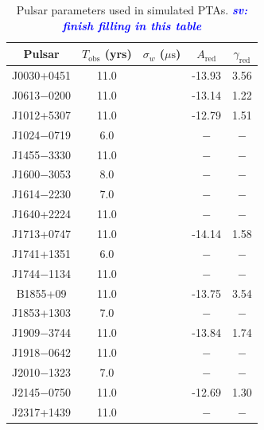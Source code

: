\documentclass[twocolumn,aps,prd,superscriptaddress]{revtex4-1}
\newcommand{\sv}[1]{\textcolor{blue}{\it{\textbf{sv: #1}}} }
\begin{document}
\begin{table}[!tb]
	\setlength{\tabcolsep}{5pt}
	\caption{Pulsar parameters used in simulated PTAs. \sv{finish filling in this table}}
	\begin{center}
	\begin{tabular}{ccccc}
		\hline\hline
    		Pulsar	& $T_\mathrm{obs}$ (yrs) & $\sigma_w$ ($\mu\mathrm{s}$) & $A_\mathrm{red}$ & $\gamma_\mathrm{red}$ \\
		\hline
		J0030+0451 & 11.0 & & -13.93 & 3.56 \\
		J0613$-$0200 & 11.0 &  & -13.14 & 1.22 \\
		J1012+5307 & 11.0 &  & -12.79 & 1.51 \\
		J1024$-$0719 & 6.0 & & $-$ & $-$ \\
		J1455$-$3330 & 11.0 & & $-$ & $-$ \\
		J1600$-$3053 & 8.0 & & $-$ & $-$ \\
		J1614$-$2230 & 7.0 & & $-$ & $-$ \\
		J1640+2224 & 11.0 & & $-$ & $-$ \\
		J1713+0747 & 11.0 & & -14.14 & 1.58 \\
		J1741+1351 & 6.0 & & $-$ & $-$ \\
		J1744$-$1134 & 11.0 & & $-$ & $-$ \\
		B1855+09 & 11.0 & & -13.75 & 3.54 \\
		J1853+1303 & 7.0 & & $-$ & $-$ \\
		J1909$-$3744 & 11.0 &  & -13.84 & 1.74  \\
		J1918$-$0642 & 11.0 & & $-$ & $-$ \\
		J2010$-$1323 & 7.0 & & $-$ & $-$ \\
		J2145$-$0750 & 11.0 &  & -12.69 & 1.30 \\
		J2317+1439 & 11.0 & & $-$ & $-$ \\
    		\hline\hline
	\end{tabular}
	\end{center}
	\label{tab:sim}
\end{table}
\end{document}
